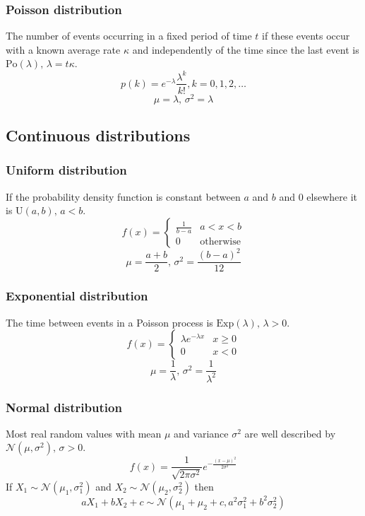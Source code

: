 \documentclass[a4paper]{article}
\begin{document}
\begin{landscape}
\begin{multicols}{2}
\subsubsection{Poisson distribution}
The number of events occurring in a fixed period of time $t$ if these events occur with a known average rate $\kappa$ and independently of the time since the last event is $\textrm{Po}(\lambda),\,\lambda=t\kappa$.
\[p(k)=e^{-\lambda}\frac{\lambda^k}{k!}, k=0,1,2,\dots\]
\[\mu=\lambda,\,\sigma^2=\lambda\]

\subsection{Continuous distributions}

\subsubsection{Uniform distribution}
If the probability density function is constant between $a$ and $b$ and 0 elsewhere it is $\textrm{U}(a,b),\,a<b$.
\[f(x) = \left\{
\begin{array}{cl}
\frac{1}{b-a} & a<x<b\\
0 & \textrm{otherwise}
\end{array}\right.\]
\[\mu=\frac{a+b}{2},\,\sigma^2=\frac{(b-a)^2}{12}\]

\subsubsection{Exponential distribution}
The time between events in a Poisson process is $\textrm{Exp}(\lambda),\,\lambda>0$.
\[f(x) = \left\{
\begin{array}{cl}
\lambda e^{-\lambda x} & x\geq0\\
0 & x<0
\end{array}\right.\]
\[\mu=\frac{1}{\lambda},\,\sigma^2=\frac{1}{\lambda^2}\]

\subsubsection{Normal distribution}
Most real random values with mean $\mu$ and variance $\sigma^2$ are well described by $\mathcal{N}(\mu,\sigma^2),\,\sigma>0$.
\[ f(x) = \frac{1}{\sqrt{2\pi\sigma^2}}e^{-\frac{(x-\mu)^2}{2\sigma^2}} \]
If $X_1 \sim \mathcal{N}(\mu_1,\sigma_1^2)$ and $X_2 \sim \mathcal{N}(\mu_2,\sigma_2^2)$ then
\[ aX_1 + bX_2 + c \sim \mathcal{N}(\mu_1+\mu_2+c,a^2\sigma_1^2+b^2\sigma_2^2) \]


\end{multicols}
\end{landscape}
\end{document}
